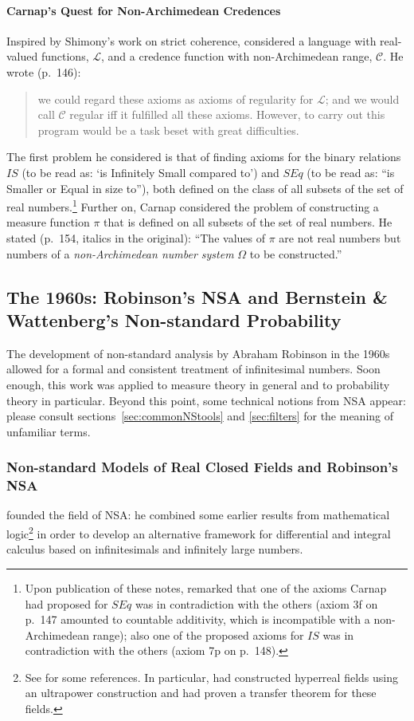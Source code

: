 \paragraph{Carnap's Quest for Non-Archimedean Credences}
Inspired by Shimony's work on strict coherence, \citet{Carnap:1980} considered a language with real-valued functions, $\mathcal{L}$, and a credence function with non-Archimedean range, $\mathcal{C}$. He wrote (p.~146):
\begin{quote}
we could regard these axioms as axioms of regularity for $\mathcal{L}$; and we would call $\mathcal{C}$ regular iff it fulfilled all these axioms. However, to carry out this program would be a task beset with great difficulties.
\end{quote}
The first problem he considered is that of finding axioms for the binary relations $IS$ (to be read as: `is Infinitely Small compared to') and $SEq$ (to be read as: ``is Smaller or Equal in size to''), both defined on the class of all subsets of the set of real numbers.\footnote{Upon publication of these notes, \citet{Hoover:1980} remarked that one of the axioms Carnap had proposed for $SEq$ was in contradiction with the others (axiom 3f on p.~147 amounted to countable additivity, which is incompatible with a non-Archimedean range); also one of the proposed axioms for $IS$ was in contradiction with the others (axiom 7p on p.~148).} Further on, Carnap considered the problem of constructing a measure function $\pi$ that is defined on all subsets of the set of real numbers. He stated (p.~154, italics in the original):
``The values of $\pi$ are not real numbers but numbers of a \emph{non-Archimedean number system} $\Omega$ to be constructed.''

\subsection{The 1960s: Robinson's NSA and Bernstein \& Wattenberg's Non-standard Probability}
The development of non-standard analysis by Abraham Robinson in the 1960s allowed for a formal and consistent treatment of infinitesimal numbers. Soon enough, this work was applied to measure theory in general and to probability theory in particular. Beyond this point, some technical notions from NSA appear: please consult sections~\ref{sec:commonNStools} and \ref{sec:filters} for the meaning of unfamiliar terms.

\subsubsection*{Non-standard Models of Real Closed Fields and Robinson's NSA}\label{sec:RCFs}
\citet{Robinson:1961,Robinson:1966} founded the field of NSA: he combined some earlier results from mathematical logic\footnote{See \citet[p.~48]{Robinson:1966} for some references. In particular, \citet{Hewitt:1948} had constructed hyperreal fields using an ultrapower construction and \citet{Los:1955} had proven a transfer theorem for these fields.} in order to develop an alternative framework for differential and integral calculus based on infinitesimals and infinitely large numbers.

